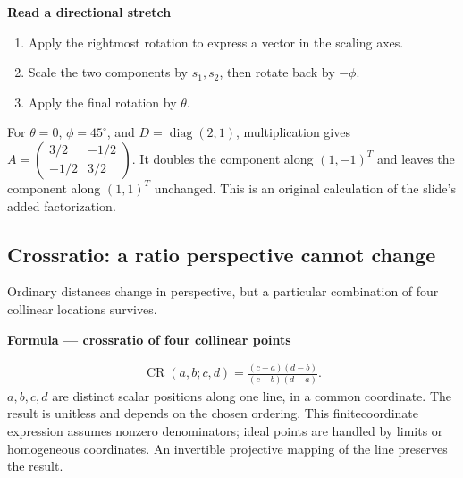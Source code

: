 \documentclass[letterpaper,11pt,english,openany,oneside]{jupyterBook}
\begin{document}
\begin{TextbookBox}
\textbf{Read a directional stretch}\par\smallskip
\begin{enumerate}
%
\item {}
\sphinxAtStartPar
Apply the rightmost rotation to express a vector in the scaling axes.

\item {}
\sphinxAtStartPar
Scale the two components by \(s_1,s_2\), then rotate back by \(-\phi\).

\item {}
\sphinxAtStartPar
Apply the final rotation by \(\theta\).

\end{enumerate}

\sphinxAtStartPar
For \(\theta=0\), \(\phi=45^\circ\), and \(D=\operatorname{diag}(2,1)\), multiplication gives \(A=\begin{pmatrix}3/2&-1/2\\-1/2&3/2\end{pmatrix}\). It doubles the component along \((1,-1)^T\) and leaves the component along \((1,1)^T\) unchanged. This is an original calculation of the slide’s added factorization.

\end{TextbookBox}


\subsection{Cross\sphinxhyphen{}ratio: a ratio perspective cannot change}
\label{\detokenize{lectures/lecture02/homographies:cross-ratio-a-ratio-perspective-cannot-change}}
\sphinxAtStartPar
Ordinary distances change in perspective, but a particular combination of four collinear locations survives.

\begin{TextbookBox}
\textbf{Formula — cross\sphinxhyphen{}ratio of four collinear points}\par\smallskip
\begin{equation}\label{equation:lectures/lecture02/homographies:eq-lec02-crossratio}
\begin{split}\operatorname{CR}(a,b;c,d)=
\frac{(c-a)(d-b)}{(c-b)(d-a)}.\end{split}
\end{equation}
\sphinxAtStartPar
\(a,b,c,d\) are distinct scalar positions along one line, in a common coordinate. The result is unitless and depends on the chosen ordering. This finite\sphinxhyphen{}coordinate expression assumes nonzero denominators; ideal points are handled by limits or homogeneous coordinates. An invertible projective mapping of the line preserves the result.

\end{TextbookBox}
\end{document}

